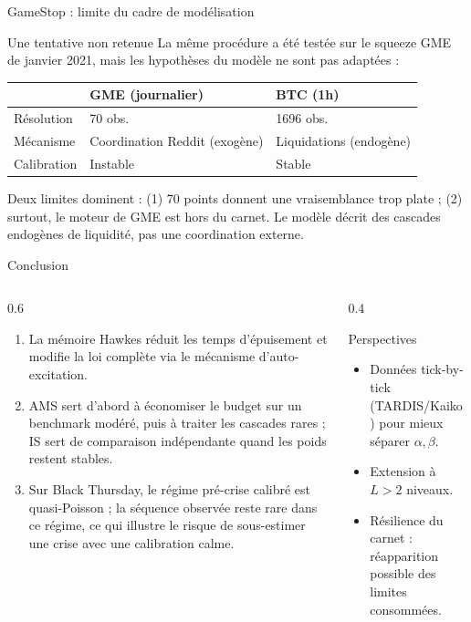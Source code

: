 \documentclass[10pt,aspectratio=169]{beamer}
\begin{document}
\begin{frame}{GameStop : limite du cadre de modélisation}
\begin{block}{Une tentative non retenue}
La même procédure a été testée sur le squeeze GME de janvier 2021, mais les hypothèses du modèle ne sont pas adaptées :
\end{block}
\centering\small
\begin{tabular}{lll}
\toprule
& GME (journalier) & BTC (1h)\\
\midrule
Résolution & 70 obs. & 1696 obs.\\
Mécanisme & Coordination Reddit (\alert{exogène}) & Liquidations (\alert{endogène})\\
Calibration & Instable & Stable\\
\bottomrule
\end{tabular}
\vspace{1.5ex}

\raggedright
\normalsize Deux limites dominent : (1) 70 points donnent une vraisemblance trop plate ; (2) surtout, le moteur de GME est \alert{hors du carnet}. Le modèle décrit des cascades endogènes de liquidité, pas une coordination externe.
\end{frame}

\begin{frame}{Conclusion} \begin{columns}[T] \begin{column}{0.6\textwidth} \begin{enumerate} \item[\textbf{I.}] La mémoire Hawkes réduit les temps d'épuisement et modifie la loi complète via le mécanisme d'auto-excitation. \item[\textbf{II.}] AMS sert d'abord à économiser le budget sur un benchmark modéré, puis à traiter les cascades rares ; IS sert de comparaison indépendante quand les poids restent stables. \item[\textbf{III.}] Sur Black Thursday, le régime pré-crise calibré est quasi-Poisson ; la séquence observée reste rare dans ce régime, ce qui illustre le risque de sous-estimer une crise avec une calibration calme. \end{enumerate} \end{column} \begin{column}{0.4\textwidth} \begin{block}{Perspectives} \begin{itemize} \item Données tick-by-tick (TARDIS/Kaiko) pour mieux séparer $\alpha,\beta$. \item Extension à $L>2$ niveaux. \item Résilience du carnet : réapparition possible des limites consommées. \end{itemize} \end{block} \end{column} \end{columns} \end{frame}
\end{document}
